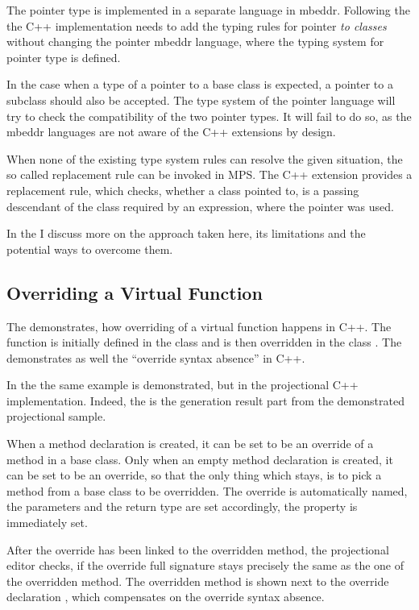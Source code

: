 The pointer type is implemented in a separate language in mbeddr. Following the  the C++ implementation
needs to add the typing rules for pointer \emph{to classes} without changing the pointer mbeddr language, where the 
typing system for pointer type is defined.

In the case when a type of a pointer to a base class is expected, a pointer to a subclass should also be accepted.
The type system of the pointer language will try to check the compatibility of the two pointer types. It will
fail to do so, as the mbeddr languages are not aware of the C++ extensions by design.

When none of the existing type system rules can resolve the given situation, the so called replacement
rule can be invoked in MPS. The C++ extension provides a replacement rule, which checks, whether a
class pointed to, is a passing descendant of the class required by an expression, where the pointer was
used.

In the  I discuss more on the approach taken here, its limitations and 
the potential ways to overcome them.

\subsection{Overriding a Virtual Function}

The  demonstrates, how overriding of a virtual function happens in C++.
The function  is initially defined in the class  and is then overridden
in the class . The  demonstrates as well the ``override syntax absence'' in C++.


In the  the same example is demonstrated, but in the projectional C++ implementation.
Indeed, the  is the generation result part from the demonstrated projectional sample.

When a method declaration is created, it can be set to be an override of a method in a base class.
Only when an empty method declaration is created, it can be set to be an override, so that the only
thing which stays, is to pick a method from a base class to be overridden. The override is automatically
named, the parameters and the return type are set accordingly, the  property is immediately
set. 

After the override has been linked to the overridden method, the projectional editor checks, if 
the override full signature stays precisely the same as the one of the overridden method. 
The overridden method is shown next to the override declaration , which 
compensates on the override syntax absence.

